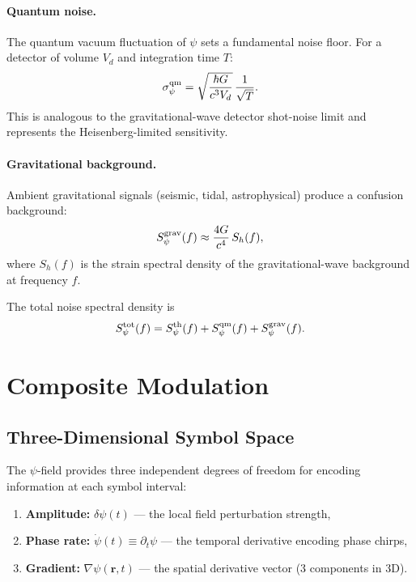 \documentclass[twocolumn,superscriptaddress,prd,nofootinbib]{revtex4-2}
\begin{document}
\paragraph{Quantum noise.}
The quantum vacuum fluctuation of $\psi$ sets a fundamental noise floor.
For a detector of volume $V_d$ and integration time $T$:
\begin{equation}
\sigma_\psi^{\rm qm} = \sqrt{\frac{\hbar G}{c^3 V_d}}\,\frac{1}{\sqrt{T}}.
\label{eq:quantum-noise}
\end{equation}
This is analogous to the gravitational-wave detector shot-noise limit
and represents the Heisenberg-limited sensitivity.

\paragraph{Gravitational background.}
Ambient gravitational signals (seismic, tidal, astrophysical) produce a
confusion background:
\begin{equation}
S_\psi^{\rm grav}(f) \approx \frac{4G}{c^4}\,S_h(f),
\label{eq:grav-background}
\end{equation}
where $S_h(f)$ is the strain spectral density of the gravitational-wave
background at frequency $f$.

The total noise spectral density is
\begin{equation}
S_\psi^{\rm tot}(f) = S_\psi^{\rm th}(f) + S_\psi^{\rm qm}(f) +
S_\psi^{\rm grav}(f).
\label{eq:total-noise}
\end{equation}

\section{Composite Modulation}\label{sec:modulation}

\subsection{Three-Dimensional Symbol Space}

The $\psi$-field provides three independent degrees of freedom for
encoding information at each symbol interval:
\begin{enumerate}[label=(\roman*)]
\item \textbf{Amplitude:} $\delta\psi(t)$ --- the local field
perturbation strength,
\item \textbf{Phase rate:} $\dot{\psi}(t) \equiv \partial_t\psi$ --- the
temporal derivative encoding phase chirps,
\item \textbf{Gradient:} $\nabla\psi(\mathbf{r},t)$ --- the spatial
derivative vector (3 components in 3D).
\end{enumerate}
\end{document}
